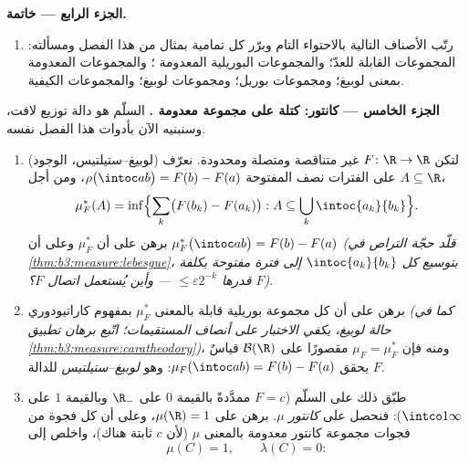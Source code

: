 \begin{problem}
\medskip
\noindent\textbf{الجزء الرابع --- خاتمة.}
\begin{enumerate}[resume]
  \item رتّب الأصناف التالية بالاحتواء التام وبرّر كل تمامية
        بمثال من هذا الفصل ومسألته: المجموعات القابلة للعدّ؛
        والمجموعات البوريلية المعدومة ؛ والمجموعات
        المعدومة  بمعنى لوبيغ؛ ومجموعات بوريل؛ ومجموعات
        لوبيغ؛ والمجموعات الكيفية.
\end{enumerate}

\medskip
\noindent\textbf{الجزء الخامس ---  كانتور: كتلة على مجموعة
معدومة .} السلّم هو دالة توزيع  لافت، وسنبنيه الآن
بأدوات هذا الفصل نفسه.
\begin{enumerate}[resume]
  \item (لوبيغ--ستيلتيس، الوجود) لتكن $F\colon\R\to\R$ غير
        متناقصة ومتصلة ومحدودة. نعرّف على الفترات نصف المفتوحة
        $\rho\bigl(\intoc ab\bigr) = F(b) -
        F(a)$، ومن أجل $A \subseteq \R$،
        \[
        \mu_F^*(A) = \inf\Bigl\{\sum_k\bigl(F(b_k) -
        F(a_k)\bigr) : A \subseteq
        \bigcup_k\intoc{a_k}{b_k}\Bigr\} .
        \]
        برهن على أن $\mu_F^*$  وعلى أن
        $\mu_F^*\bigl(\intoc ab\bigr) = F(b) - F(a)$
        \emph{(قلّد حجّة التراص في \cref{thm:b3:measure:lebesgue}، بتوسيع كل
        $\intoc{a_k}{b_k}$ إلى فترة مفتوحة بكلفة $F$ قدرها $\leq \varepsilon2^{-k}$ --- وأين
        يُستعمل اتصال $F$؟)}.
  \item برهن على أن كل مجموعة بوريلية قابلة  بالمعنى
        $\mu_F^*$ بمفهوم كاراتيودوري \emph{(كما في حالة لوبيغ،
        يكفي الاختبار على أنصاف المستقيمات؛ اتّبع برهان تطبيق
        \cref{thm:b3:measure:caratheodory})}، ومنه فإن $\mu_F = \mu_F^*$ مقصورًا على
        $\mathcal B(\R)$ قياسٌ يحقق $\mu_F(\intoc ab) = F(b) - F(a)$: وهو \emph{
        لوبيغ--ستيلتيس} للدالة $F$.
  \item طبّق ذلك على السلّم ($F = c$ ممدَّدةً بالقيمة $0$ على
        $\R_-$ وبالقيمة $1$ على $\intco1\infty$): فنحصل على
        \emph{ كانتور} $\mu$. برهن على $\mu(\R) = 1$، وعلى
        أن كل فجوة من فجوات مجموعة كانتور معدومة  بالمعنى
        $\mu$ (لأن $c$ ثابتة هناك)، واخلص إلى
        \[
        \mu(C) = 1, \qquad \lambda(C) = 0 :
\]
\end{enumerate}
\end{problem}
